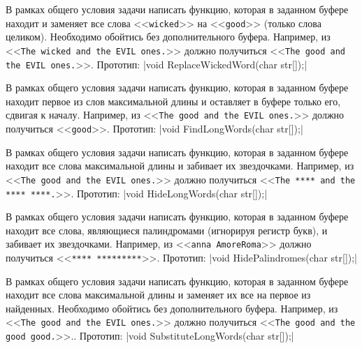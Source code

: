 
\begin{zztask}
В рамках общего условия задачи написать функцию, которая в заданном буфере
находит и заменяет все слова <<\texttt{wicked}>> на <<\texttt{good}>> (только слова целиком).
Необходимо обойтись без дополнительного буфера.
Например, из
<<\texttt{The wicked and the EVIL ones.}>>
должно получиться
<<\texttt{The good and the EVIL ones.}>>.
%
Прототип: |void ReplaceWickedWord(char str[]);|
\end{zztask}


\begin{zztask}
В рамках общего условия задачи написать функцию, которая в заданном буфере
находит первое из слов максимальной длины и оставляет в буфере только его,
сдвигая к началу.
Например, из
<<\texttt{The good and the EVIL ones.}>>
должно получиться
<<\texttt{good}>>.
%
Прототип: |void FindLongWords(char str[]);|
\end{zztask}


\begin{zztask}
В рамках общего условия задачи написать функцию, которая в заданном буфере
находит все слова максимальной длины и забивает их звездочками.
Например, из
<<\texttt{The good and the EVIL ones.}>>
должно получиться
<<\texttt{The **** and the **** ****.}>>.
%
Прототип: |void HideLongWords(char str[]);|
\end{zztask}


\begin{zztask}
В рамках общего условия задачи написать функцию, которая в заданном буфере
находит все слова, являющиеся палиндромами (игнорируя регистр букв), и
забивает их звездочками.
Например, из
<<\texttt{anna AmoreRoma}>>
должно получиться
<<\texttt{**** *********}>>.
%
Прототип: |void HidePalindromes(char str[]);|
\end{zztask}


\begin{zztask}
В рамках общего условия задачи написать функцию, которая в заданном буфере
находит все слова максимальной длины и заменяет их все на первое из
найденных.
Необходимо обойтись без дополнительного буфера.
Например, из
<<\texttt{The good and the EVIL ones.}>>
должно получиться
<<\texttt{The good and the good good.}>>..
%
Прототип: |void SubstituteLongWords(char str[]);|
\end{zztask}

